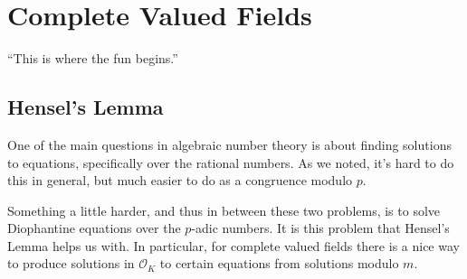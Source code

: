 \documentclass[]{article}
\theoremstyle{custhm}
\theoremstyle{cusdef}
\theoremstyle{custhm}
\theoremstyle{custhm}
\theoremstyle{custhm}
\theoremstyle{custhm}
\theoremstyle{cusdef}
\theoremstyle{remark}
\renewcommand{\O}{\mathcal{O}}
\begin{document}

\section{Complete Valued Fields}

``This is where the fun begins.''

\subsection{Hensel's Lemma}

One of the main questions in algebraic number theory is about finding solutions to equations, specifically over the rational numbers. As we noted, it's hard to do this in general, but much easier to do as a congruence modulo $p$.

Something a little harder, and thus in between these two problems, is to solve Diophantine equations over the $p$-adic numbers. It is this problem that Hensel's Lemma helps us with. In particular, for complete valued fields there is a nice way to produce solutions in $\O_K$ to certain equations from solutions modulo $m$.
\end{document}
